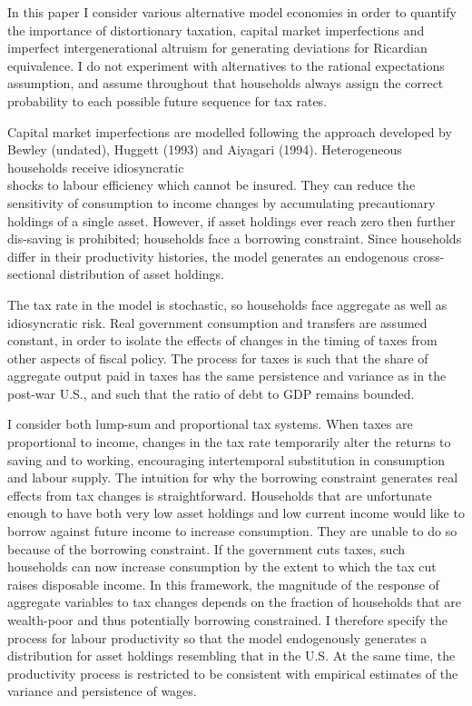 \documentclass[11pt]{article}
\begin{document}
In this paper I consider various alternative model economies in order to quantify the importance of distortionary taxation, capital market imperfections and imperfect intergenerational altruism for generating deviations for Ricardian equivalence. I do not experiment with alternatives to the rational expectations assumption, and assume throughout that households always assign the correct probability to each possible future sequence for tax rates.

Capital market imperfections are modelled following the approach developed by Bewley (undated), Huggett (1993) and Aiyagari (1994). Heterogeneous households receive idiosyncratic\\
shocks to labour efficiency which cannot be insured. They can reduce the sensitivity of consumption to income changes by accumulating precautionary holdings of a single asset. However, if asset holdings ever reach zero then further dis-saving is prohibited; households face a borrowing constraint. Since households differ in their productivity histories, the model generates an endogenous cross-sectional distribution of asset holdings.

The tax rate in the model is stochastic, so households face aggregate as well as idiosyncratic risk. Real government consumption and transfers are assumed constant, in order to isolate the effects of changes in the timing of taxes from other aspects of fiscal policy. The process for taxes is such that the share of aggregate output paid in taxes has the same persistence and variance as in the post-war U.S., and such that the ratio of debt to GDP remains bounded.

I consider both lump-sum and proportional tax systems. When taxes are proportional to income, changes in the tax rate temporarily alter the returns to saving and to working, encouraging intertemporal substitution in consumption and labour supply. The intuition for why the borrowing constraint generates real effects from tax changes is straightforward. Households that are unfortunate enough to have both very low asset holdings and low current income would like to borrow against future income to increase consumption. They are unable to do so because of the borrowing constraint. If the government cuts taxes, such households can now increase consumption by the extent to which the tax cut raises disposable income. In this framework, the magnitude of the response of aggregate variables to tax changes depends on the fraction of households that are wealth-poor and thus potentially borrowing constrained. I therefore specify the process for labour productivity so that the model endogenously generates a distribution for asset holdings resembling that in the U.S. At the same time, the productivity process is restricted to be consistent with empirical estimates of the variance and persistence of wages.
\end{document}
